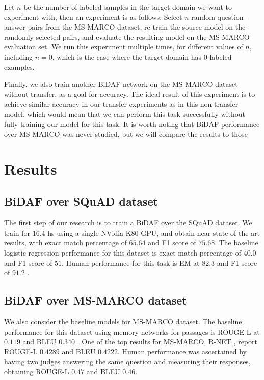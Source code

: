 \documentclass[11pt,a4paper]{article}
\begin{document}
Let $n$ be the number of labeled samples in the target domain we want to experiment with, then an experiment is as follows: Select $n$ random question-answer pairs from the MS-MARCO dataset, re-train the source model on the randomly selected pairs, and evaluate the resulting model on the MS-MARCO evaluation set. We run this experiment multiple times, for different values of $n$, including $n=0$, which is the case where the target domain has $0$ labeled examples. 

Finally, we also train another BiDAF network on the MS-MARCO dataset without transfer, as a goal for accuracy. The ideal result of this experiment is to achieve similar accuracy in our transfer experiments as in this non-transfer model, which would mean that we can perform this task successfully without fully training our model for this task. It is worth noting that BiDAF performance over MS-MARCO was never studied, but we will compare the results to those 

\section{Results}
\label{sec:results}

\subsection{BiDAF over SQuAD dataset}

The first step of our research is to train a BiDAF over the SQuAD dataset. We train for 16.4 hs using a single NVidia K80 GPU, and obtain near state of the art results, with exact match percentage of $65.64$ and F1 score of $75.68$. The baseline logistic regression performance for this dataset is exact match percentage of $40.0$ and F1 score of $51$. Human performance for this task is EM at $82.3$ and F1 score of $91.2$ \cite{squad:2016} \cite{rnet}.

\subsection{BiDAF over MS-MARCO dataset}

We also consider the baseline models for MS-MARCO dataset. The baseline performance for this dataset using memory networks for passages is ROUGE-L at $0.119$ and BLEU $0.340$ \cite{msmarco:2016}. One of the top results for MS-MARCO, R-NET \cite{rnet}, report ROUGE-L $0.4289$ and BLEU $0.4222$. Human performance was ascertained by having two judges answering the same question and measuring their responses, obtaining ROUGE-L $0.47$ and BLEU $0.46$.
\end{document}
